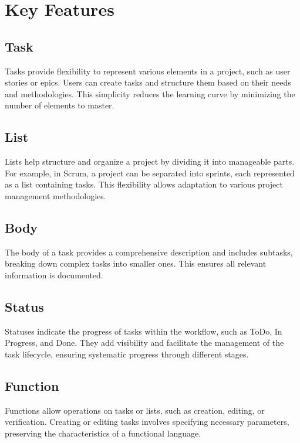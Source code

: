 \section{Key Features}
\label{sec:key-features}

\subsection{Task}
\label{sec:task}
Tasks provide flexibility to represent various elements in a project, such as user stories or epics. Users can create tasks and structure them based on their needs and methodologies. This simplicity reduces the learning curve by minimizing the number of elements to master.

\subsection{List}
\label{sec:list}
Lists help structure and organize a project by dividing it into manageable parts. For example, in Scrum, a project can be separated into sprints, each represented as a list containing tasks. This flexibility allows adaptation to various project management methodologies.

\subsection{Body}
\label{sec:body}
The body of a task provides a comprehensive description and includes subtasks, breaking down complex tasks into smaller ones. This ensures all relevant information is documented.

\subsection{Status}
\label{sec:status}
Statuses indicate the progress of tasks within the workflow, such as ToDo, In Progress, and Done. They add visibility and facilitate the management of the task lifecycle, ensuring systematic progress through different stages.

\subsection{Function}
\label{sec:function}
Functions allow operations on tasks or lists, such as creation, editing, or verification. Creating or editing tasks involves specifying necessary parameters, preserving the characteristics of a functional language.

